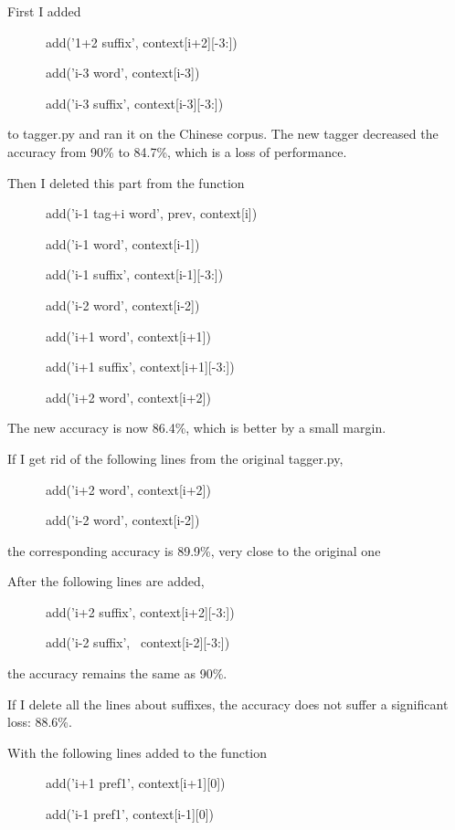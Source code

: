 \documentclass[letterpaper]{article}
\title{}
\author{}
\date{2018-11-28}
\begin{document}
First I added 

\ \ \ \ \ \ add('1+2 suffix', context[i+2][-3:])

\ \ \ \ \ \ add('i-3 word', context[i-3])

\ \ \ \ \ \ add('i-3 suffix', context[i-3][-3:])

to tagger.py and ran it on the Chinese corpus. The new tagger decreased the accuracy from 90\% to 84.7\%, which is a
loss of performance.


\bigskip

Then I deleted this part from the function

\ \ \ \ \ \ add('i-1 tag+i word', prev, context[i])

\ \ \ \ \ \ add('i-1 word', context[i-1])

\ \ \ \ \ \ add('i-1 suffix', context[i-1][-3:])

\ \ \ \ \ \ add('i-2 word', context[i-2])

\ \ \ \ \ \ add('i+1 word', context[i+1])

\ \ \ \ \ \ add('i+1 suffix', context[i+1][-3:])

\ \ \ \ \ \ add('i+2 word', context[i+2])

The new accuracy is now 86.4\%, which is better by a small margin.


\bigskip

If I get rid of the following lines from the original tagger.py,

\ \ \ \ \ \ add('i+2 word', context[i+2])

\ \ \ \ \ \ add('i-2 word', context[i-2])

the corresponding accuracy is 89.9\%, very close to the original one


\bigskip

After the following lines are added,

\ \ \ \ \ \ add('i+2 suffix', context[i+2][-3:])

\ \ \ \ \ \ add('i-2 suffix', \ context[i-2][-3:])

the accuracy remains the same as 90\%.


\bigskip

If I delete all the lines about suffixes, the accuracy does not suffer a significant loss: 88.6\%.


\bigskip

With the following lines added to the function

\ \ \ \ \ \ add('i+1 pref1', context[i+1][0])

\ \ \ \ \ \ add('i-1 pref1', context[i-1][0])
\end{document}
